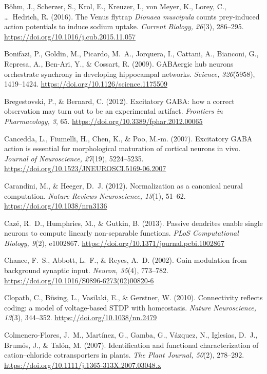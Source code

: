 \documentclass[11pt,a4paper]{article}
\newenvironment{apabib}{\raggedright\begin{list}{}{%
  \setlength{\leftmargin}{1.6em}\setlength{\itemindent}{-1.6em}%
  \setlength{\itemsep}{3pt}\setlength{\parsep}{0pt}\setlength{\topsep}{4pt}}}%
  {\end{list}}
\begin{document}
\begin{apabib}
\item B\"ohm, J., Scherzer, S., Krol, E., Kreuzer, I., von Meyer, K., Lorey, C., \ldots\ Hedrich, R. (2016). The Venus flytrap \emph{Dionaea muscipula} counts prey-induced action potentials to induce sodium uptake. \emph{Current Biology, 26}(3), 286--295. \url{https://doi.org/10.1016/j.cub.2015.11.057}
\item Bonifazi, P., Goldin, M., Picardo, M.~A., Jorquera, I., Cattani, A., Bianconi, G., Represa, A., Ben-Ari, Y., \& Cossart, R. (2009). GABAergic hub neurons orchestrate synchrony in developing hippocampal networks. \emph{Science, 326}(5958), 1419--1424. \url{https://doi.org/10.1126/science.1175509}
\item Bregestovski, P., \& Bernard, C. (2012). Excitatory GABA: how a correct observation may turn out to be an experimental artifact. \emph{Frontiers in Pharmacology, 3}, 65. \url{https://doi.org/10.3389/fphar.2012.00065}
\item Cancedda, L., Fiumelli, H., Chen, K., \& Poo, M.-m. (2007). Excitatory GABA action is essential for morphological maturation of cortical neurons in vivo. \emph{Journal of Neuroscience, 27}(19), 5224--5235. \url{https://doi.org/10.1523/JNEUROSCI.5169-06.2007}
\item Carandini, M., \& Heeger, D.~J. (2012). Normalization as a canonical neural computation. \emph{Nature Reviews Neuroscience, 13}(1), 51--62. \url{https://doi.org/10.1038/nrn3136}
\item Caz\'e, R.~D., Humphries, M., \& Gutkin, B. (2013). Passive dendrites enable single neurons to compute linearly non-separable functions. \emph{PLoS Computational Biology, 9}(2), e1002867. \url{https://doi.org/10.1371/journal.pcbi.1002867}
\item Chance, F.~S., Abbott, L.~F., \& Reyes, A.~D. (2002). Gain modulation from background synaptic input. \emph{Neuron, 35}(4), 773--782. \url{https://doi.org/10.1016/S0896-6273(02)00820-6}
\item Clopath, C., B\"using, L., Vasilaki, E., \& Gerstner, W. (2010). Connectivity reflects coding: a model of voltage-based STDP with homeostasis. \emph{Nature Neuroscience, 13}(3), 344--352. \url{https://doi.org/10.1038/nn.2479}
\item Colmenero-Flores, J.~M., Mart\'inez, G., Gamba, G., V\'azquez, N., Iglesias, D.~J., Brum\'os, J., \& Tal\'on, M. (2007). Identification and functional characterization of cation--chloride cotransporters in plants. \emph{The Plant Journal, 50}(2), 278--292. \url{https://doi.org/10.1111/j.1365-313X.2007.03048.x}

\end{apabib}
\end{document}
